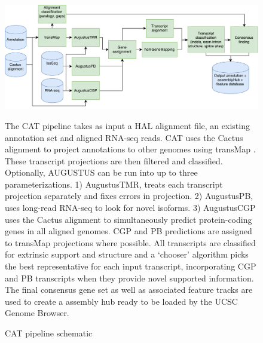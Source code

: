 \documentclass[fleqn,10pt]{wlscirep}
\begin{document}

\clearpage

\begin{figure}
\centering
\includegraphics[width=\textwidth,height=\textheight,keepaspectratio]{CAT.pdf}
\caption{CAT pipeline schematic}
The CAT pipeline takes as input a HAL alignment file, an existing annotation set and aligned RNA-seq reads. CAT uses the Cactus alignment to project annotations to other genomes using transMap \cite{stanke2008using}. These transcript projections are then filtered and classified. Optionally, AUGUSTUS can be run into up to three parameterizations. 1) AugustusTMR, treats each transcript projection separately and fixes errors in projection. 2) AugustusPB, uses long-read RNA-seq to look for novel isoforms. 3) AugustusCGP \cite{konig2015simultaneous} uses the Cactus alignment to simultaneously predict protein-coding genes in all aligned genomes. CGP and PB predictions are assigned to transMap projections where possible. All transcripts are classified for extrinsic support and structure and a ‘chooser’ algorithm picks the best representative for each input transcript, incorporating CGP and PB transcripts when they provide novel supported information. The final consensus gene set as well as associated feature tracks are used to create a assembly hub ready to be loaded by the UCSC Genome Browser.
\label{fig:pipeline}
\end{figure}
\end{document}
